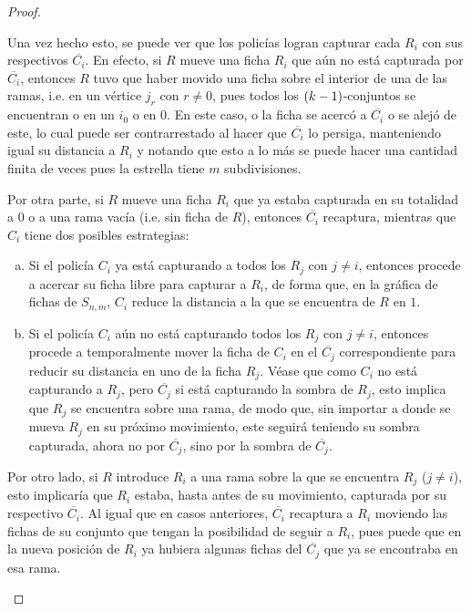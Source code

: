 \begin{proof}
\begin{enumerate}
            Una vez hecho esto, se puede ver que los polic\'ias logran capturar
            cada $R_i$ con sus respectivos $\overline{C_i}$. En efecto, si $R$
            mueve una ficha $R_i$ que a\'un no est\'a capturada por
            $\overline{C_i}$, entonces $R$ tuvo que haber movido una ficha sobre
            el interior de una de las ramas, i.e. en un v\'ertice $j_r$ con
            $r\neq 0$, pues todos los $\left( k-1\right)$-conjuntos se encuentran o en un
            $i_0$ o en $0$. En este caso, o la ficha se acerc\'o a
            $\overline{C_i}$ o se alej\'o de este, lo cual puede ser
            contrarrestado al hacer que $\overline{C_i}$ lo persiga, manteniendo
            igual su distancia a $R_i$ y notando que esto a lo m\'as se puede
            hacer una cantidad finita de veces pues la estrella tiene $m$
            subdivisiones.
            
            Por otra parte, si $R$ mueve una ficha $R_i$ que ya estaba capturada
            en su totalidad a $0$ o a una rama vac\'ia (i.e. sin ficha de $R$),
            entonces $\overline{C_i}$ recaptura, mientras que $C_i$ tiene dos
            posibles estrategias:
            \begin{enumerate}[(a)]
                \item Si el polic\'ia $C_i$ ya est\'a capturando a todos los
                $R_j$ con $j\neq i$, entonces procede a acercar su ficha libre
                para capturar a $R_i$, de forma que, en la gr\'afica de fichas
                de $S_{n,m}$, $C_i$ reduce la distancia a la que se encuentra de
                $R$ en $1$.
                \item Si el polic\'ia $C_i$ a\'un no est\'a capturando todos los
                $R_j$ con $j\neq i$, entonces procede a temporalmente mover la
                ficha de $C_i$ en el $\overline{C_j}$ correspondiente para
                reducir su distancia en uno de la ficha $R_j$. V\'ease que como
                $C_i$ no est\'a capturando a $R_j$, pero $\overline{C_j}$ si
                est\'a capturando la sombra de $R_j$, esto implica que $R_j$ se
                encuentra sobre una rama, de modo que, sin importar a donde se
                mueva $R_j$ en su pr\'oximo movimiento, este seguir\'a teniendo
                su sombra capturada, ahora no por $\overline{C_j}$, sino por la
                sombra de $\overline{C_j}$.
            \end{enumerate}
            
            Por otro lado, si $R$ introduce $R_i$ a una rama sobre la que se
            encuentra $R_j$ ($j\neq i$), esto implicar\'ia que $R_i$ estaba,
            hasta antes de su movimiento, capturada por su respectivo
            $\overline{C_i}$. Al igual que en casos anteriores, $\overline{C_i}$
            recaptura a $R_i$ moviendo las fichas de su conjunto que tengan la
            posibilidad de seguir a $R_i$, pues puede que en la nueva posici\'on
            de $R_i$ ya hubiera algunas fichas del $\overline{C_j}$ que ya se
            encontraba en esa rama. 
            

\end{enumerate}
\end{proof}
